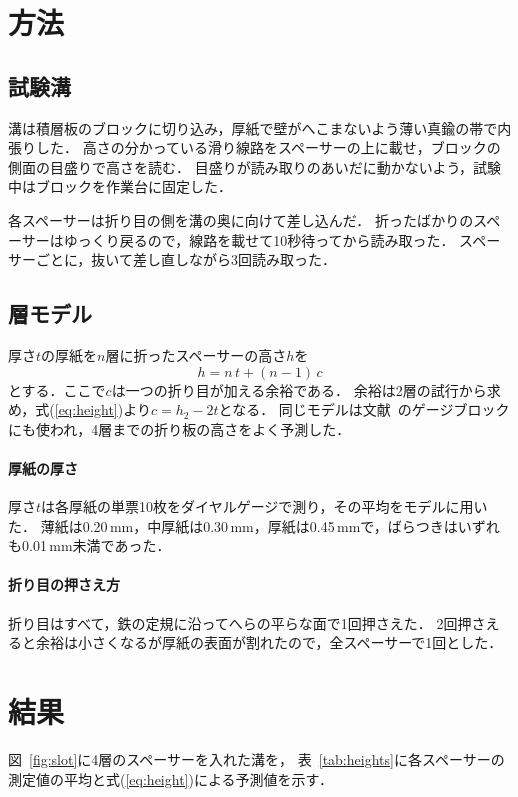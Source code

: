 \documentclass[paper]{ieicej}
\begin{document}
\section{方法}\label{sec:method}
\subsection{試験溝}\label{sec:slot}
溝は積層板のブロックに切り込み，厚紙で壁がへこまないよう薄い真鍮の帯で内張りした．
高さの分かっている滑り線路をスペーサーの上に載せ，ブロックの側面の目盛りで高さを読む．
目盛りが読み取りのあいだに動かないよう，試験中はブロックを作業台に固定した．

各スペーサーは折り目の側を溝の奥に向けて差し込んだ．
折ったばかりのスペーサーはゆっくり戻るので，線路を載せて10秒待ってから読み取った．
スペーサーごとに，抜いて差し直しながら3回読み取った．

\subsection{層モデル}\label{sec:model}
厚さ$t$の厚紙を$n$層に折ったスペーサーの高さ$h$を
\begin{equation}
h = n\,t + (n-1)\,c
\label{eq:height}
\end{equation}
とする．ここで$c$は一つの折り目が加える余裕である．
余裕は2層の試行から求め，式(\ref{eq:height})より$c = h_2 - 2t$となる．
同じモデルは文献~\cite{scale23}のゲージブロックにも使われ，4層までの折り板の高さをよく予測した．

\paragraph{厚紙の厚さ}
厚さ$t$は各厚紙の単票10枚をダイヤルゲージで測り，その平均をモデルに用いた．
薄紙は0.20\,mm，中厚紙は0.30\,mm，厚紙は0.45\,mmで，ばらつきはいずれも0.01\,mm未満であった．

\paragraph{折り目の押さえ方}
折り目はすべて，鉄の定規に沿ってへらの平らな面で1回押さえた．
2回押さえると余裕は小さくなるが厚紙の表面が割れたので，全スペーサーで1回とした．

\section{結果}\label{sec:results}
図~\ref{fig:slot}に4層のスペーサーを入れた溝を，
表~\ref{tab:heights}に各スペーサーの測定値の平均と式(\ref{eq:height})による予測値を示す．
\end{document}
